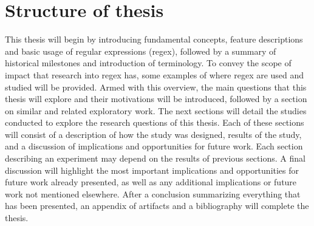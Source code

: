 \section{Structure of thesis}
This thesis will begin by introducing fundamental concepts, feature descriptions and basic usage of regular expressions (regex), followed by a summary of historical milestones and introduction of terminology.  To convey the scope of impact that research into regex has, some examples of where regex are used and studied will be provided.  Armed with this overview, the main questions that this thesis will explore and their motivations will be introduced, followed by a section on similar and related exploratory work.  The next  sections will detail the studies conducted to explore the research questions of this thesis.  Each of these sections will consist of a description of how the study was designed, results of the study, and a discussion of implications and opportunities for future work.  Each section describing an experiment may depend on the results of previous sections.  A final discussion will highlight the most important implications and opportunities for future work already presented, as well as any additional implications or future work not mentioned elsewhere.  After a conclusion summarizing everything that has been presented, an appendix of artifacts and a bibliography will complete the thesis.

